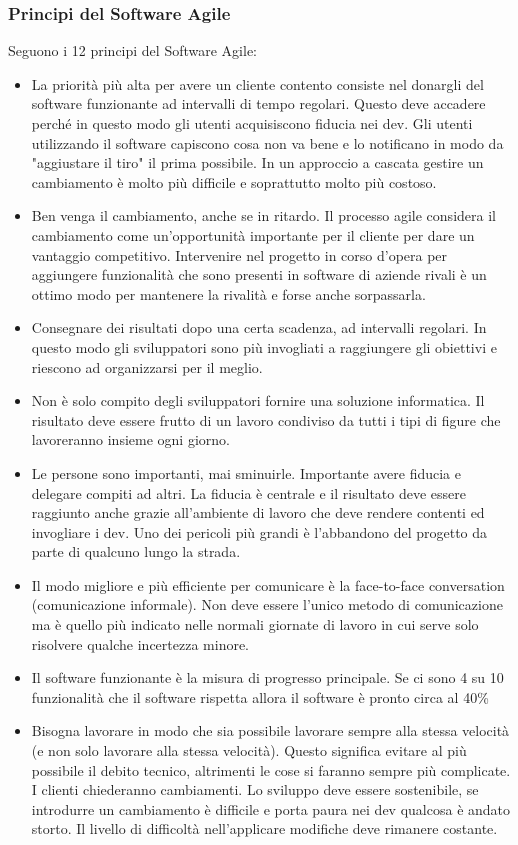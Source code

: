 \subsubsection{Principi del Software Agile}
Seguono i 12 principi del Software Agile:
\begin{itemize}
	\item La priorità più alta per avere un cliente contento consiste nel donargli del software funzionante ad intervalli di tempo regolari. Questo deve accadere perché in questo modo gli utenti acquisiscono fiducia nei dev. Gli utenti utilizzando il software capiscono cosa non va bene e lo notificano in modo da "aggiustare il tiro" il prima possibile. In un approccio a cascata gestire un cambiamento è molto più difficile e soprattutto molto più costoso.
	\item Ben venga il cambiamento, anche se in ritardo. Il processo agile considera il cambiamento come un'opportunità importante per il cliente per dare un vantaggio competitivo. Intervenire nel progetto in corso d'opera per aggiungere funzionalità che sono presenti in software di aziende rivali è un ottimo modo per mantenere la rivalità e forse anche sorpassarla.
	\item Consegnare dei risultati dopo una certa scadenza, ad intervalli regolari. In questo modo gli sviluppatori sono più invogliati a raggiungere gli obiettivi e riescono ad organizzarsi per il meglio.
	\item Non è solo compito degli sviluppatori fornire una soluzione informatica. Il risultato deve essere frutto di un lavoro condiviso da tutti i tipi di figure che lavoreranno insieme ogni giorno.
	\item Le persone sono importanti, mai sminuirle. Importante avere fiducia e delegare compiti ad altri. La fiducia è centrale e il risultato deve essere raggiunto anche grazie all'ambiente di lavoro che deve rendere contenti ed invogliare i dev. Uno dei pericoli più grandi è l'abbandono del progetto da parte di qualcuno lungo la strada.
	\item Il modo migliore e più efficiente per comunicare è la face-to-face conversation (comunicazione informale). Non deve essere l'unico metodo di comunicazione ma è quello più indicato nelle normali giornate di lavoro in cui serve solo risolvere qualche incertezza minore.
	\item Il software funzionante è la misura di progresso principale. Se ci sono 4 su 10 funzionalità che il software rispetta allora il software è pronto circa al 40\%
	\item Bisogna lavorare in modo che sia possibile lavorare sempre alla stessa velocità (e non solo lavorare alla stessa velocità). Questo significa evitare al più possibile il debito tecnico, altrimenti le cose si faranno sempre più complicate. I clienti chiederanno cambiamenti. Lo sviluppo deve essere sostenibile, se introdurre un cambiamento è difficile e porta paura nei dev qualcosa è andato storto. Il livello di difficoltà nell'applicare modifiche deve rimanere costante.

\end{itemize}

